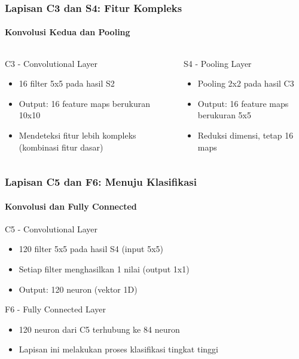 \documentclass[t,aspectratio=169,xcolor=dvipsnames]{beamer}
\begin{document}
\begin{frame}
    \frametitle{Lapisan C3 dan S4: Fitur Kompleks}
    \framesubtitle{Konvolusi Kedua dan Pooling}
    \small
    \begin{columns}[T]
        \begin{block}{C3 - Convolutional Layer}
            \begin{itemize}
                \item 16 filter 5x5 pada hasil S2
                \item Output: 16 feature maps berukuran 10x10
                \item Mendeteksi fitur lebih kompleks (kombinasi fitur dasar)
            \end{itemize}
        \end{block}
        \begin{block}{S4 - Pooling Layer}
            \begin{itemize}
                \item Pooling 2x2 pada hasil C3
                \item Output: 16 feature maps berukuran 5x5
                \item Reduksi dimensi, tetap 16 maps
            \end{itemize}
        \end{block}
    \end{columns}
\end{frame}

\begin{frame}
    \frametitle{Lapisan C5 dan F6: Menuju Klasifikasi}
    \framesubtitle{Konvolusi dan Fully Connected}
    \small
    \begin{block}{C5 - Convolutional Layer}
        \begin{itemize}
            \item 120 filter 5x5 pada hasil S4 (input 5x5)
            \item Setiap filter menghasilkan 1 nilai (output 1x1)
            \item Output: 120 neuron (vektor 1D)
        \end{itemize}
    \end{block}
    \begin{block}{F6 - Fully Connected Layer}
        \begin{itemize}
            \item 120 neuron dari C5 terhubung ke 84 neuron
            \item Lapisan ini melakukan proses klasifikasi tingkat tinggi
        \end{itemize}
    \end{block}
\end{frame}
\end{document}
